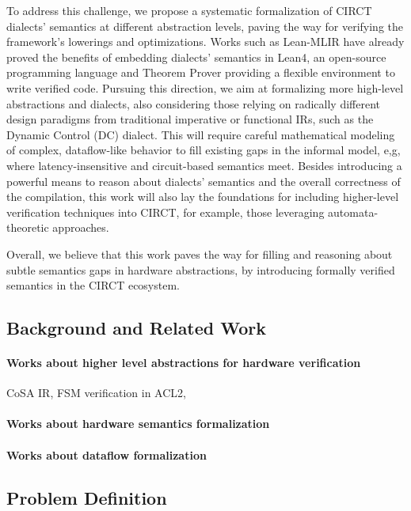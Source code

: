 \documentclass[]{article}
\begin{document}
To address this challenge, we propose a systematic formalization of CIRCT dialects' semantics at different abstraction levels, paving the way for verifying the 
framework’s lowerings and optimizations. Works such as Lean-MLIR have already proved the benefits of embedding dialects' semantics in Lean4, 
an open-source programming language and Theorem Prover providing a flexible environment to write verified code. Pursuing this direction, 
we aim at formalizing more high-level abstractions and dialects, also considering those relying on radically different design paradigms from traditional 
imperative or functional IRs, such as the Dynamic Control (DC) dialect. This will require careful mathematical modeling of complex, 
dataflow-like behavior to fill existing gaps in the informal model, e,g, where latency-insensitive and circuit-based semantics meet. 
Besides introducing a powerful means to reason about dialects' semantics and the overall correctness of the compilation, 
this work will also lay the foundations for including higher-level verification techniques into CIRCT, for example, those leveraging automata-theoretic approaches. 

Overall, we believe that this work paves the way for filling and reasoning about subtle semantics gaps in hardware abstractions, by introducing formally verified semantics in the CIRCT ecosystem.

\subsection{Background and Related Work}

\paragraph{Works about higher level abstractions for hardware verification}
CoSA IR, FSM verification in ACL2,  

\paragraph{Works about hardware semantics formalization}

\paragraph{Works about dataflow formalization}

\subsection{Problem Definition}
\end{document}
